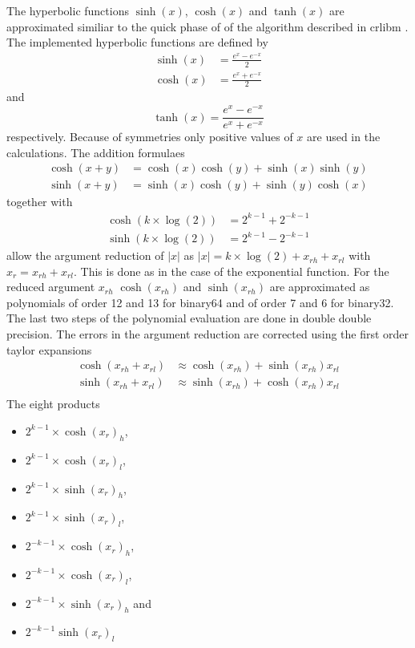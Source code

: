 \documentclass[10pt,a4paper,final,oneside]{article}
\numberwithin{equation}{subsection}
\begin{document}
The hyperbolic functions $\sinh(x)$, $\cosh(x)$ and $\tanh(x)$
are approximated similiar to the quick phase of of the algorithm
described in crlibm \cite{crlibmweb}.
The implemented hyperbolic functions are defined by
\[
    \begin{aligned}
        \sinh(x) &= \frac{e^x -  e^{-x}}{2} \\
        \cosh(x) &= \frac{e^x +  e^{-x}}{2}
    \end{aligned}
\]
and
\[
    \tanh(x) = \frac{e^x -  e^{-x}}{e^x +  e^{-x}}
\]
respectively. Because of symmetries only positive values of $x$ are used
in the calculations.
The addition formulaes
\[
    \begin{aligned}
        \cosh(x + y) &= \cosh(x)  \cosh(y) + \sinh(x)  \sinh(y) \\
        \sinh(x + y) &= \sinh(x)  \cosh(y) + \sinh(y)  \cosh(x)
    \end{aligned}
\]
together with
\[
    \begin{aligned}
        \cosh(k\times\log(2)) &= 2^{k-1} + 2^{-k-1} \\
        \sinh(k\times\log(2)) &= 2^{k-1} - 2^{-k-1}
    \end{aligned}
\]
allow the argument reduction of $|x|$ as
$ |x|= k \times \log(2) + x_{rh} + x_{rl}$ with $x_r =x_{rh} + x_{rl}$.
This is done as in the case of the exponential function.
For the reduced argument $x_{rh}$ $\cosh(x_{rh})$ and $\sinh(x_{rh})$ are approximated as polynomials of order 12 and 13 for binary64 and of
order 7 and 6 for binary32. The last two steps of the polynomial
evaluation are done in double double precision.
The errors in the argument reduction are corrected using the first
order taylor expansions
\[
    \begin{aligned}
        \cosh(x_{rh} + x_{rl}) &\approx \cosh(x_{rh}) + \sinh(x_{rh}) x_{rl} \\
        \sinh(x_{rh} + x_{rl}) &\approx \sinh(x_{rh}) + \cosh(x_{rh}) x_{rl} \\
    \end{aligned}
\]
The eight products
\begin{itemize}
\item $2^{k-1} \times \cosh(x_r)_h$,
\item $2^{k-1} \times \cosh(x_r)_l$,
\item $2^{k-1} \times \sinh(x_r)_h$,
\item $2^{k-1} \times \sinh(x_r)_l$,
\item $2^{-k-1} \times \cosh(x_r)_h$,
\item $2^{-k-1} \times \cosh(x_r)_l$,
\item $2^{-k-1} \times \sinh(x_r)_h$ and
\item $2^{-k-1} \sinh(x_r)_l$
\end{itemize}
\end{document}
